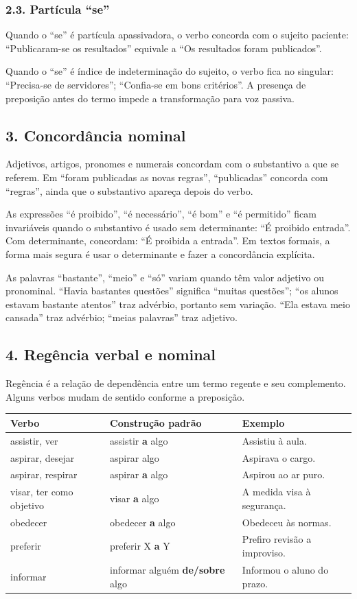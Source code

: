 \documentclass[11pt,a4paper]{article}
\begin{document}
\subsubsection*{2.3. Partícula “se”}

Quando o “se” é partícula apassivadora, o verbo concorda com o sujeito paciente: “Publicaram-se os resultados” equivale a “Os resultados foram publicados”.

Quando o “se” é índice de indeterminação do sujeito, o verbo fica no singular: “Precisa-se de servidores”; “Confia-se em bons critérios”. A presença de preposição antes do termo impede a transformação para voz passiva.

\subsection*{3. Concordância nominal}

Adjetivos, artigos, pronomes e numerais concordam com o substantivo a que se referem. Em “foram publicadas as novas regras”, “publicadas” concorda com “regras”, ainda que o substantivo apareça depois do verbo.

As expressões “é proibido”, “é necessário”, “é bom” e “é permitido” ficam invariáveis quando o substantivo é usado sem determinante: “É proibido entrada”. Com determinante, concordam: “É proibida a entrada”. Em textos formais, a forma mais segura é usar o determinante e fazer a concordância explícita.

As palavras “bastante”, “meio” e “só” variam quando têm valor adjetivo ou pronominal. “Havia bastantes questões” significa “muitas questões”; “os alunos estavam bastante atentos” traz advérbio, portanto sem variação. “Ela estava meio cansada” traz advérbio; “meias palavras” traz adjetivo.

\subsection*{4. Regência verbal e nominal}

Regência é a relação de dependência entre um termo regente e seu complemento. Alguns verbos mudam de sentido conforme a preposição.

\begin{tabularx}{\linewidth}{llX}
\toprule
 \textbf{Verbo} & \textbf{Construção padrão} & \textbf{Exemplo} \\
\midrule
 assistir, ver & assistir \textbf{a} algo & Assistiu à aula. \\
 aspirar, desejar & aspirar algo & Aspirava o cargo. \\
 aspirar, respirar & aspirar \textbf{a} algo & Aspirou ao ar puro. \\
 visar, ter como objetivo & visar \textbf{a} algo & A medida visa à segurança. \\
 obedecer & obedecer \textbf{a} algo & Obedeceu às normas. \\
 preferir & preferir X \textbf{a} Y & Prefiro revisão a improviso. \\
 informar & informar alguém \textbf{de/sobre} algo & Informou o aluno do prazo. \\
\bottomrule
\end{tabularx}
\end{document}

